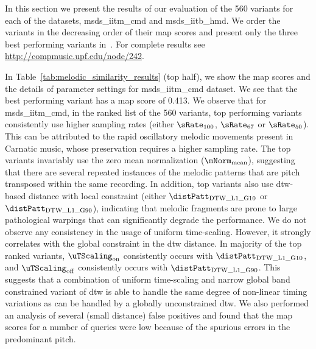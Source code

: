 In this section we present the results of our evaluation of the 560 variants for each of the datasets, \acrshort{msds_iitm_cmd} and \acrshort{msds_iitb_hmd}. We order the variants in the decreasing order of their \gls{map} scores and present only the three best performing variants in~. For complete results see \url{http://compmusic.upf.edu/node/242}. 

In Table~\ref{tab:melodic_similarity_results} (top half), we show the \gls{map} scores and the details of parameter settings for \acrshort{msds_iitm_cmd} dataset. We see that the best performing variant has a \gls{map} score of 0.413. We observe that for \acrshort{msds_iitm_cmd}, in the ranked list of the 560 variants, top performing variants consistently use higher sampling rates (either  $\sRate_{100}$, $\sRate_{67}$ or $\sRate_{50}$). This can be attributed to the rapid oscillatory melodic movements present in Carnatic music, whose preservation requires a higher sampling rate. The top variants invariably use the zero mean normalization ($\mNorm_{\mathrm{mean}}$), suggesting that there are several repeated instances of the melodic patterns that are pitch transposed within the same recording. In addition, top variants also use \gls{dtw}-based distance with local constraint (either $\distPatt_{\mathrm{DTW\_L1\_G10}}$ or $\distPatt_{\mathrm{DTW\_L1\_G90}}$), indicating that melodic fragments are prone to large pathological warpings that can significantly degrade the performance. We do not observe any consistency in the usage of uniform time-scaling. However, it strongly correlates with the global constraint in the \gls{dtw} distance. In majority of the top ranked variants, $\uTScaling_{\mathrm{on}}$ consistently occurs with $\distPatt_{\mathrm{DTW\_L1\_G10}}$, and $\uTScaling_{\mathrm{off}}$ consistently occurs with $\distPatt_{\mathrm{DTW\_L1\_G90}}$. This suggests that a combination of uniform time-scaling and narrow global band constrained variant of \gls{dtw} is able to handle the same degree of non-linear timing variations as can be handled by a globally unconstrained \gls{dtw}. We also performed an analysis of several (small distance) false positives and found that the \gls{map} scores for a number of queries were low because of the spurious errors in the predominant pitch.


